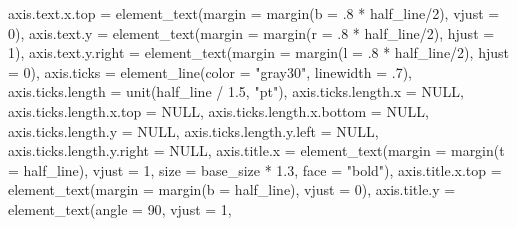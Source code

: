 \documentclass[
  letterpaper,
  DIV=11,
  numbers=noendperiod]{scrreprt}
\newenvironment{Shaded}{\begin{snugshade}}{\end{snugshade}}
\newcommand{\AttributeTok}[1]{\textcolor[rgb]{0.40,0.45,0.13}{#1}}
\newcommand{\ConstantTok}[1]{\textcolor[rgb]{0.56,0.35,0.01}{#1}}
\newcommand{\DecValTok}[1]{\textcolor[rgb]{0.68,0.00,0.00}{#1}}
\newcommand{\FloatTok}[1]{\textcolor[rgb]{0.68,0.00,0.00}{#1}}
\newcommand{\FunctionTok}[1]{\textcolor[rgb]{0.28,0.35,0.67}{#1}}
\newcommand{\NormalTok}[1]{\textcolor[rgb]{0.00,0.23,0.31}{#1}}
\newcommand{\SpecialCharTok}[1]{\textcolor[rgb]{0.37,0.37,0.37}{#1}}
\newcommand{\StringTok}[1]{\textcolor[rgb]{0.13,0.47,0.30}{#1}}
\begin{document}
\begin{Shaded}
\begin{Highlighting}[]
    \AttributeTok{axis.text.x.top =} \FunctionTok{element\_text}\NormalTok{(}\AttributeTok{margin =} \FunctionTok{margin}\NormalTok{(}\AttributeTok{b =}\NormalTok{ .}\DecValTok{8} \SpecialCharTok{*}\NormalTok{ half\_line}\SpecialCharTok{/}\DecValTok{2}\NormalTok{),}
                                   \AttributeTok{vjust =} \DecValTok{0}\NormalTok{),}
    \AttributeTok{axis.text.y =} \FunctionTok{element\_text}\NormalTok{(}\AttributeTok{margin =} \FunctionTok{margin}\NormalTok{(}\AttributeTok{r =}\NormalTok{ .}\DecValTok{8} \SpecialCharTok{*}\NormalTok{ half\_line}\SpecialCharTok{/}\DecValTok{2}\NormalTok{),}
                               \AttributeTok{hjust =} \DecValTok{1}\NormalTok{),}
    \AttributeTok{axis.text.y.right =} \FunctionTok{element\_text}\NormalTok{(}\AttributeTok{margin =} \FunctionTok{margin}\NormalTok{(}\AttributeTok{l =}\NormalTok{ .}\DecValTok{8} \SpecialCharTok{*}\NormalTok{ half\_line}\SpecialCharTok{/}\DecValTok{2}\NormalTok{),}
                                     \AttributeTok{hjust =} \DecValTok{0}\NormalTok{),}
    \AttributeTok{axis.ticks =} \FunctionTok{element\_line}\NormalTok{(}\AttributeTok{color =} \StringTok{"gray30"}\NormalTok{, }\AttributeTok{linewidth =}\NormalTok{ .}\DecValTok{7}\NormalTok{),}
    \AttributeTok{axis.ticks.length =} \FunctionTok{unit}\NormalTok{(half\_line }\SpecialCharTok{/} \FloatTok{1.5}\NormalTok{, }\StringTok{"pt"}\NormalTok{),}
    \AttributeTok{axis.ticks.length.x =} \ConstantTok{NULL}\NormalTok{,}
    \AttributeTok{axis.ticks.length.x.top =} \ConstantTok{NULL}\NormalTok{,}
    \AttributeTok{axis.ticks.length.x.bottom =} \ConstantTok{NULL}\NormalTok{,}
    \AttributeTok{axis.ticks.length.y =} \ConstantTok{NULL}\NormalTok{,}
    \AttributeTok{axis.ticks.length.y.left =} \ConstantTok{NULL}\NormalTok{,}
    \AttributeTok{axis.ticks.length.y.right =} \ConstantTok{NULL}\NormalTok{,}
    \AttributeTok{axis.title.x =} \FunctionTok{element\_text}\NormalTok{(}\AttributeTok{margin =} \FunctionTok{margin}\NormalTok{(}\AttributeTok{t =}\NormalTok{ half\_line),}
                                \AttributeTok{vjust =} \DecValTok{1}\NormalTok{, }\AttributeTok{size =}\NormalTok{ base\_size }\SpecialCharTok{*} \FloatTok{1.3}\NormalTok{,}
                                \AttributeTok{face =} \StringTok{"bold"}\NormalTok{),}
    \AttributeTok{axis.title.x.top =} \FunctionTok{element\_text}\NormalTok{(}\AttributeTok{margin =} \FunctionTok{margin}\NormalTok{(}\AttributeTok{b =}\NormalTok{ half\_line),}
                                    \AttributeTok{vjust =} \DecValTok{0}\NormalTok{),}
    \AttributeTok{axis.title.y =} \FunctionTok{element\_text}\NormalTok{(}\AttributeTok{angle =} \DecValTok{90}\NormalTok{, }\AttributeTok{vjust =} \DecValTok{1}\NormalTok{,}

\end{Highlighting}
\end{Shaded}
\end{document}
